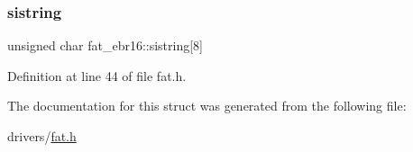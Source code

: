 \mbox{\label{a00057_a1008703850aab97e1aa8ae5ea8511ab1_a1008703850aab97e1aa8ae5ea8511ab1}} 
\subsubsection{\texorpdfstring{sistring}{sistring}}
{\footnotesize\ttfamily unsigned char fat\+\_\+ebr16\+::sistring\mbox{[}8\mbox{]}}



Definition at line 44 of file fat.\+h.



The documentation for this struct was generated from the following file\+:\begin{DoxyCompactItemize}
\item 
drivers/\hyperlink{a00002}{fat.\+h}\end{DoxyCompactItemize}
